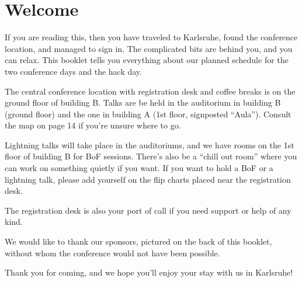 \newpage
\newpage
\section*{Welcome} \label{welcome}
If you are reading this, then you have traveled to
Karlsruhe, found the conference location, and managed to
sign in. The complicated bits are behind you, and
you can relax. This booklet tells you everything about our planned
schedule for the two conference days and the hack day.

The central conference location with registration desk and
coffee breaks is on the ground floor of building B. Talks are
be held in the auditorium in building B (ground floor) and
the one in building A (1st floor, signposted ``Aula''). Consult 
the map on page 14 if you're unsure where to go.

Lightning talks will take place in the auditoriums, 
and we have rooms on
the 1st floor of building B for BoF sessions. There's also be a ``chill out
room'' where you can work on something quietly if you
want. If you want to hold a BoF or a lightning talk, please
add yourself on the flip charts placed
near the registration desk.

The registration desk is also your port of call if you need
support or help of any kind. 

\vspace{0.4em}

We would like to thank our sponsors, pictured on the back
of this booklet, without whom the conference would not
have been possible.

\vspace{0.4em}
Thank you for coming, and we hope you'll enjoy your stay with us in Karlsruhe!

\newpage
